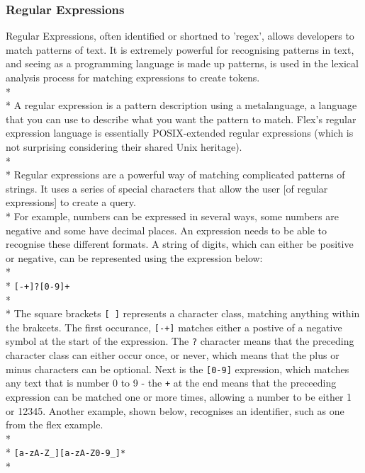 \documentclass[12pt]{report}
\begin{document}
\subsubsection{Regular Expressions}\label{subsubsec:regex}
Regular Expressions, often identified or shortned to 'regex', allows developers to match patterns of text.  It is extremely powerful for recognising patterns in text, and seeing as a programming language is made up patterns, is used in the lexical analysis process for matching expressions to create tokens.
\\*
\\*
A regular expression is a pattern description using a metalanguage, a language that you can use to describe what you want the pattern to match.  Flex's regular expression language is essentially POSIX-extended regular expressions (which is not surprising considering their shared Unix heritage). \citep{flexandbison09}
\\*
\\*
Regular expressions are a powerful way of matching complicated patterns of strings.  It uses a series of special characters that allow the user [of regular expressions] to create a query.
\\*
For example, numbers can be expressed in several ways, some numbers are negative and some have decimal places.  An expression needs to be able to recognise these different formats.  A string of digits, which can either be positive or negative, can be represented using the expression below:\\*
\\*
\texttt{[-+]?[0-9]+}
\\*
\\*
The square brackets \texttt{[ ]} represents a character class, matching anything within the brakcets.  The first occurance, \texttt{[-+]} matches either a postive of a negative symbol at the start of the expression.  The \texttt{?} character means that the preceding character class can either occur once, or never, which means that the plus or minus characters can be optional.  Next is the \texttt{[0-9]} expression, which matches any text that is number 0 to 9 - the \texttt{+} at the end means that the preceeding expression can be matched one or more times, allowing a number to be either 1 or 12345.  Another example, shown below, recognises an identifier, such as one from the flex example.
\\*
\\*
\texttt{[a-zA-Z\_][a-zA-Z0-9\_]*}
\\*
\end{document}
